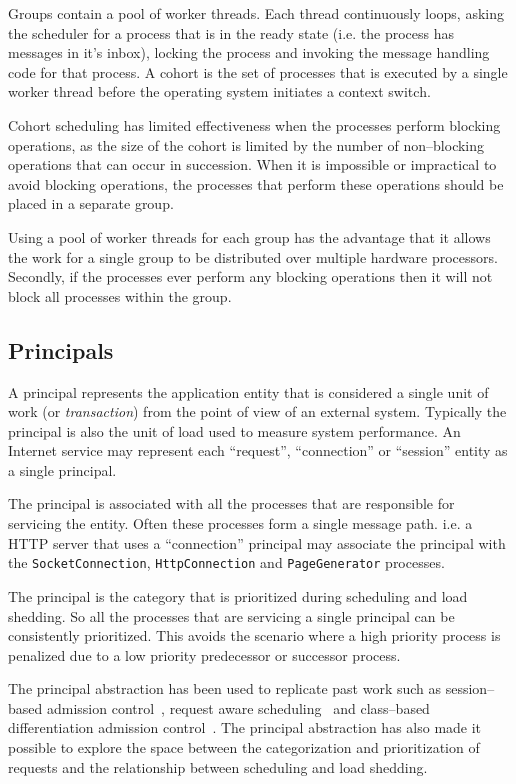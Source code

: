 \documentclass[conference,a4paper,final]{IEEEtran}
\begin{document}
Groups contain a pool of worker threads. Each thread continuously loops, asking the scheduler for a process that is in the ready state (i.e. the process has messages in it's inbox), locking the process and invoking the message handling code for that process. A cohort is the set of processes that is executed by a single worker thread before the operating system initiates a context switch.

Cohort scheduling has limited effectiveness when the processes perform blocking operations, as the size of the cohort is limited by the number of non--blocking operations that can occur in succession. When it is impossible or impractical to avoid blocking operations, the processes that perform these operations should be placed in a separate group.

Using a pool of worker threads for each group has the advantage that it allows the work for a single group to be distributed over multiple hardware processors. Secondly, if the processes ever perform any blocking operations then it will not block all processes within the group. 

\subsection{Principals}

A principal represents the application entity that is considered a single unit of work (or \emph{transaction}) from the point of view of an external system. Typically the principal is also the unit of load used to measure system performance. An Internet service may represent each ``request'', ``connection'' or ``session'' entity as a single principal.

The principal is associated with all the processes that are responsible for servicing the entity. Often these processes form a single message path. i.e. a HTTP server that uses a ``connection'' principal may associate the principal with the \verb+SocketConnection+, \verb+HttpConnection+ and \verb+PageGenerator+ processes.

The principal is the category that is prioritized during scheduling and load shedding. So all the processes that are servicing a single principal can be consistently prioritized. This avoids the scenario where a high priority process is penalized due to a low priority predecessor or successor process.

The principal abstraction has been used to replicate past work such as session--based admission control~\cite{Cherkasova:2002yb}, request aware scheduling~\cite{Zhou06RequestAware} and class--based differentiation admission control~\cite{welsh03Adaptive}. The principal abstraction has also made it possible to explore the space between the categorization and prioritization of requests and the relationship between scheduling and load shedding.
\end{document}
